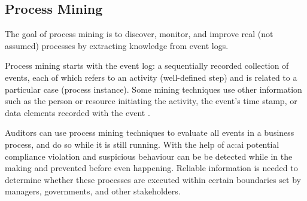 

\subsection{Process Mining}\label{sec:psmin}

The goal of process mining is to discover, monitor, and improve real (not assumed) processes by extracting knowledge from event logs. 

Process mining starts with the event log: a sequentially recorded collection of events, each of which refers to an activity (well-defined step) and is related to a particular case (process instance). Some mining techniques use other information such as the person or resource initiating the activity, the event's time stamp, or data elements recorded with the event \citep{5427384}.

Auditors can use process mining techniques to evaluate all events in a business process, and do so while it is still running. With the help of \gls{ac:ai} potential compliance violation and suspicious behaviour can be be detected while in the making and prevented before even happening. Reliable information is needed to determine whether these processes are executed within certain boundaries set by managers, governments, and other stakeholders. 





